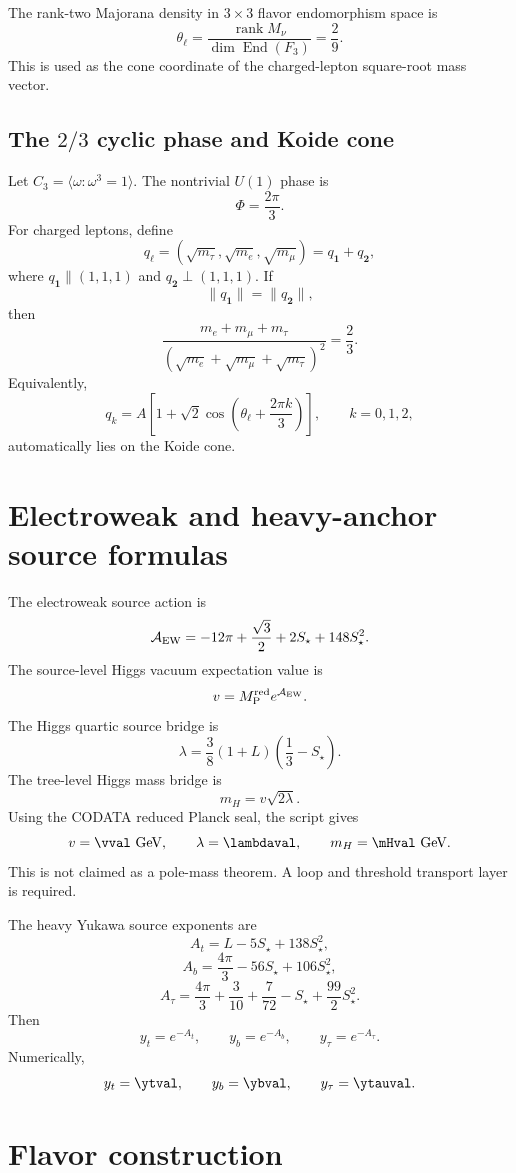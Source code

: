 \documentclass[11pt]{article}
\newcommand{\Mred}{M_{\rm P}^{\rm red}}
\newcommand{\End}{\operatorname{End}}
\newcommand{\rank}{\operatorname{rank}}
\begin{document}
The rank-two Majorana density in \(3\times3\) flavor endomorphism space is
\[
\theta_\ell=
\frac{\rank M_\nu}{\dim\End(F_3)}
=
\frac29.
\]
This is used as the cone coordinate of the charged-lepton square-root mass vector.

\subsection{The \(2/3\) cyclic phase and Koide cone}

Let \(C_3=\langle\omega:\omega^3=1\rangle\). The nontrivial \(U(1)\) phase is
\[
\Phi=\frac{2\pi}{3}.
\]
For charged leptons, define
\[
q_\ell=(\sqrt{m_\tau},\sqrt{m_e},\sqrt{m_\mu})
=q_{\mathbf 1}+q_{\mathbf 2},
\]
where \(q_{\mathbf 1}\parallel(1,1,1)\) and \(q_{\mathbf 2}\perp(1,1,1)\). If
\[
\|q_{\mathbf1}\|=\|q_{\mathbf2}\|,
\]
then
\[
\frac{m_e+m_\mu+m_\tau}
{(\sqrt{m_e}+\sqrt{m_\mu}+\sqrt{m_\tau})^2}
=
\frac23.
\]
Equivalently,
\[
q_k=A\left[
1+\sqrt2\cos\left(\theta_\ell+\frac{2\pi k}{3}\right)
\right],
\qquad
k=0,1,2,
\]
automatically lies on the Koide cone.

\section{Electroweak and heavy-anchor source formulas}

The electroweak source action is
\[
\mathcal A_{\rm EW}
=
-12\pi+\frac{\sqrt3}{2}+2S_\star+148S_\star^2.
\]
The source-level Higgs vacuum expectation value is
\[
v=\Mred e^{\mathcal A_{\rm EW}}.
\]
The Higgs quartic source bridge is
\[
\lambda=
\frac38(1+L)\left(\frac13-S_\star\right).
\]
The tree-level Higgs mass bridge is
\[
m_H=v\sqrt{2\lambda}.
\]
Using the CODATA reduced Planck seal, the script gives
\[
v=\vval\ {\rm GeV},\qquad
\lambda=\lambdaval,\qquad
m_H=\mHval\ {\rm GeV}.
\]
This is not claimed as a pole-mass theorem. A loop and threshold transport layer is required.

The heavy Yukawa source exponents are
\[
A_t=L-5S_\star+138S_\star^2,
\]
\[
A_b=\frac{4\pi}{3}-56S_\star+106S_\star^2,
\]
\[
A_\tau=\frac{4\pi}{3}+\frac3{10}+\frac7{72}-S_\star+\frac{99}{2}S_\star^2.
\]
Then
\[
y_t=e^{-A_t},\qquad y_b=e^{-A_b},\qquad y_\tau=e^{-A_\tau}.
\]
Numerically,
\[
y_t=\ytval,\qquad y_b=\ybval,\qquad y_\tau=\ytauval.
\]

\section{Flavor construction}
\end{document}
